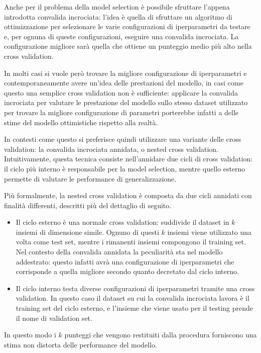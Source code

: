 \documentclass[../../main.tex]{subfiles}
\begin{document}
    Anche per il problema della model selection è possibile sfruttare l'appena introdotta convalida incrociata: l'idea è quella di sfruttare un algoritmo di ottimizzazione per selezionare le varie configurazioni di iperparametri da testare e, per ognuna di queste configurazioni, eseguire una convalida incrociata. La configurazione migliore sarà quella che ottiene un punteggio medio più alto nella cross validation.
    
    In molti casi si vuole però trovare la migliore configurazione di iperparametri e contemporaneamente avere un'idea delle prestazioni del modello, in casi come questo una semplice cross validation non è sufficiente: applicare la convalida incrociata per valutare le prestazione del modello sullo stesso dataset utilizzato per trovare la migliore configurazione di parametri porterebbe infatti a delle stime del modello ottimistiche rispetto alla realtà.

    In contesti come questo si preferisce quindi utilizzare una variante delle cross validation: la convalida incrociata annidata, o nested cross validation. Intuitivamente, questa tecnica consiste nell'annidare due cicli di cross validation: il ciclo più interno è responsabile per la model selection, mentre quello esterno permette di valutare le performance di generalizzazione.

    Più formalmente, la nested cross validation è composta da due cicli annidati con finalità differenti, descritti più del dettaglio di seguito.
    \begin{itemize}
        \item Il ciclo esterno è una normale cross validation: suddivide il dataset in $k$ insiemi di dimensione simile. Ognuno di questi $k$ insiemi viene utilizzato una volta come test set, mentre i rimanenti insiemi compongono il training set. Nel contesto della convalida annidata la peculiarità sta nel modello addestrato: questo infatti avrà una configurazione di iperparametri che corrisponde a quella migliore secondo quanto decretato dal ciclo interno.
        \item Il ciclo interno testa diverse configurazioni di iperparametri tramite una cross validation. In questo caso il dataset su cui la convalida incrociata lavora è il training set del ciclo esterno, e l'insieme che viene usato per il testing prende il nome di validation set.
    \end{itemize}
    In questo modo i $k$ punteggi che vengono restituiti dalla procedura forniscono una stima non distorta delle performance del modello.
\end{document}
